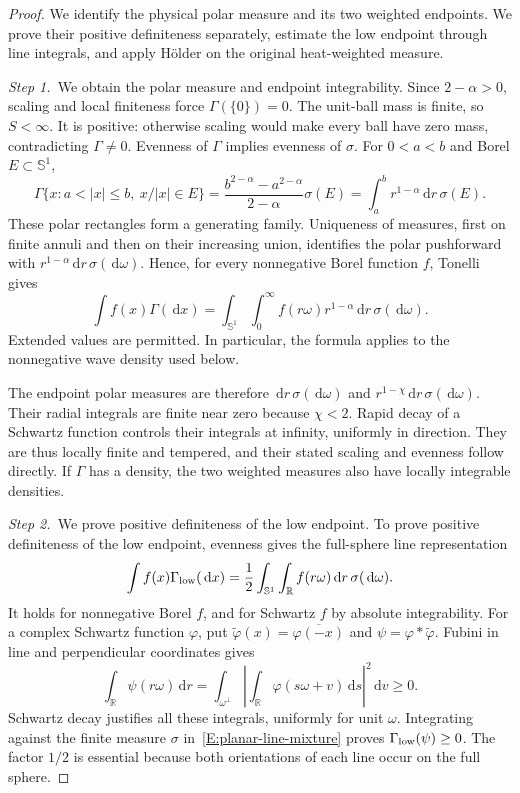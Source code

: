 \documentclass[12pt,oneside,openany]{book}
\numberwithin{equation}{section}
\theoremstyle{nogostyle}
\theoremstyle{definition}
\newcommand{\R}{\mathbb{R}}
\newcommand{\ud}{\,\mathrm{d}}
\begin{document}
\begin{proof}
  We identify the physical polar measure and its two weighted endpoints. We
  prove their positive definiteness separately, estimate the low endpoint
  through line integrals, and apply Hölder on the original heat-weighted
  measure.


  \medskip
  \noindent\textit{Step 1.~}We obtain the polar measure and endpoint
  integrability.
  Since $2-\alpha > 0$, scaling and local finiteness force $\Gamma(\{0\}) = 0$.
  The unit-ball mass is finite, so $S < \infty$. It is positive: otherwise
  scaling would make every ball have zero mass, contradicting $\Gamma \ne 0$.
  Evenness of $\Gamma$ implies evenness of $\sigma$. For $0 < a < b$ and Borel
  $E \subset \mathbb{S}^1$,
  \[
    \Gamma\{x:a<|x|\le b,\ x/|x|\in E\}
    =\frac{b^{2-\alpha}-a^{2-\alpha}}{2-\alpha}\sigma(E)
    =\int_a^b r^{1-\alpha}\ud r\,\sigma(E).
  \]
  These polar rectangles form a generating family. Uniqueness of measures, first
  on finite annuli and then on their increasing union, identifies the polar
  pushforward with $r^{1-\alpha}\ud r\,\sigma(\ud\omega)$. Hence, for every
  nonnegative Borel function $f$, Tonelli gives
  \begin{equation}\label{E:planar-polar}
    \int f(x)\Gamma(\ud x)
    =\int_{\mathbb{S}^1}\int_0^\infty
    f(r\omega)r^{1-\alpha}\ud r\,\sigma(\ud\omega).
  \end{equation}
  Extended values are permitted. In particular, the formula applies to the
  nonnegative wave density used below.

  The endpoint polar measures are therefore $\ud r\,\sigma(\ud\omega)$ and
  $r^{1-\chi}\ud r\,\sigma(\ud\omega)$. Their radial integrals are finite near
  zero because $\chi < 2$. Rapid decay of a Schwartz function controls their
  integrals at infinity, uniformly in direction. They are thus locally finite
  and tempered, and their stated scaling and evenness follow directly. If
  $\Gamma$ has a density, the two weighted measures also have locally integrable
  densities.


  \medskip
  \noindent\textit{Step 2.~}We prove positive definiteness of the low
  endpoint.
  To prove positive definiteness of the low endpoint, evenness gives the
  full-sphere line representation
  \begin{equation}\label{E:planar-line-mixture}
    \int f(x)\Gamma_{\rm low}(\ud x)
    =\frac12\int_{\mathbb{S}^1}\int_\R f(r\omega)\ud r
    \,\sigma(\ud\omega).
  \end{equation}
  It holds for nonnegative Borel $f$, and for Schwartz $f$ by absolute
  integrability. For a complex Schwartz function $\varphi$, put
  $\widetilde{\varphi}(x) = \overline{\varphi(-x)}$ and $\psi =
  \varphi*\widetilde{\varphi}$. Fubini in line and perpendicular coordinates
  gives
  \[
    \int_\R\psi(r\omega)\ud r
    =\int_{\omega^\perp}
    \left|\int_\R\varphi(s\omega+v)\ud s\right|^2\ud v\ge0.
  \]
  Schwartz decay justifies all these integrals, uniformly for unit $\omega$.
  Integrating against the finite measure $\sigma$
  in~\eqref{E:planar-line-mixture} proves $\Gamma_{\rm low}(\psi) \ge 0$. The
  factor $1/2$ is essential because both orientations of each line occur on the
  full sphere.



\end{proof}
\end{document}
